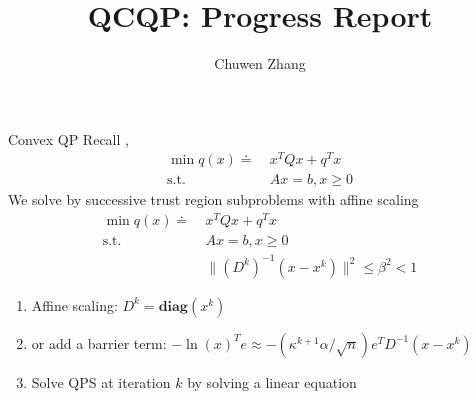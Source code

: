 \documentclass{beamerswitch}
\title{QCQP: Progress Report}
\newcommand{\diag}{\textbf{diag}}
\newcommand{\st}{\mathrm{s.t.\;}}
\begin{document}
\author{
  Chuwen Zhang
}
\frame{\titlepage}

\begin{frame}[allowframebreaks]{Convex QP}
  Recall \cite{ye_extension_1989}, \cite{ye_affine_1992}
  \begin{align*}
    \min q(x)\doteq ~ & x^TQx + q^Tx    \\
    \st             ~ & Ax = b, x \ge 0
  \end{align*}
  We solve by successive trust region subproblems with affine scaling
  \begin{align*}
    \min q(x)\doteq ~ & x^TQx + q^Tx                               \\
    \st             ~ & Ax = b, x \ge 0                            \\
                      & \|(D^k)^{-1}(x - x^k)\|^2  \le \beta^2 < 1
  \end{align*}

  \begin{enumerate}
    \item  Affine scaling: \(D^k = \diag(x^k)\)
    \item  or add a barrier term: \(- \ln(x)^Te \approx - \left(\kappa^{k+1} \alpha / \sqrt{n}\right) e^{T} D^{-1}\left(x-x^{k}\right)\)
    \item  Solve QPS at iteration \(k\) by solving a linear equation
  \end{enumerate}
\end{frame}
\end{document}
